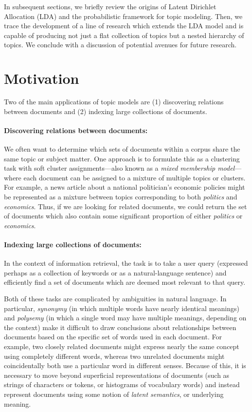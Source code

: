 \documentclass{article}
\begin{document}
In subsequent sections, we briefly review the origins of Latent Dirichlet Allocation (LDA) and the probabilistic framework for topic modeling.
Then, we trace the development of a line of research which extends the LDA model and is capable of producing not just a flat collection of topics but a nested hierarchy of topics.
We conclude with a discussion of potential avenues for future research.

\section{Motivation}
Two of the main applications of topic models are (1) discovering relations between documents and (2) indexing large collections of documents.

\paragraph{Discovering relations between documents:}
We often want to determine which sets of documents within a corpus share the same topic or subject matter.
One approach is to formulate this as a clustering task with soft cluster assignments---also known as a \emph{mixed membership model}---where each document can be assigned to a mixture of multiple topics or clusters.
For example, a news article about a national politician's economic policies might be represented as a mixture between topics corresponding to both \emph{politics} and \emph{economics}.
Thus, if we are looking for related documents, we could return the set of documents which also contain some significant proportion of either \emph{politics} or \emph{economics}.

\paragraph{Indexing large collections of documents:}
In the context of information retrieval, the task is to take a user query (expressed perhaps as a collection of keywords or as a natural-language sentence) and efficiently find a set of documents which are deemed most relevant to that query.

Both of these tasks are complicated by ambiguities in natural language.
In particular, \emph{synonymy} (in which multiple words have nearly identical meanings) and \emph{polysemy} (in which a single word may have multiple meanings, depending on the context) make it difficult to draw conclusions about relationships between documents based on the specific set of words used in each document.
For example, two closely related documents might express nearly the same concept using completely different words, whereas two unrelated documents might coincidentally both use a particular word in different senses.
Because of this, it is necessary to move beyond superficial representations of documents (such as strings of characters or tokens, or histograms of vocabulary words) and instead represent documents using some notion of \emph{latent semantics}, or underlying meaning.
\end{document}

